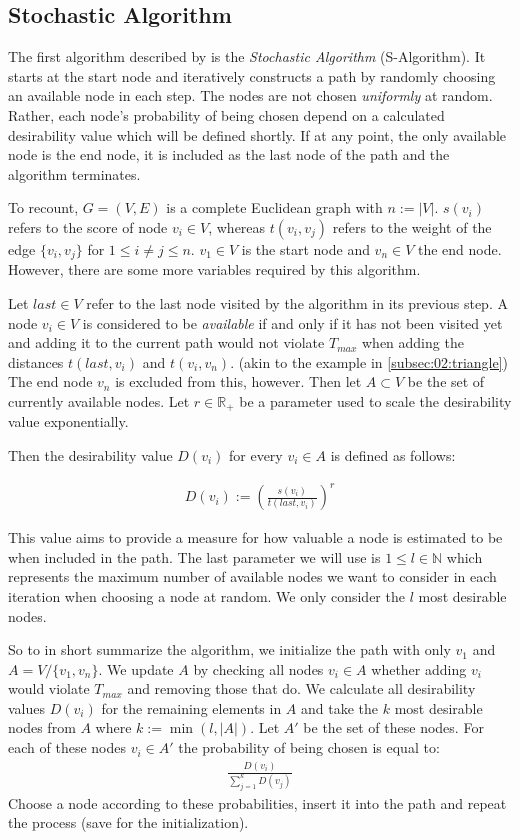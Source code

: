 \subsection{Stochastic Algorithm}
\label{subsec:03:salgo}

The first algorithm described by \citeauthor{tsiligiridis_heuristic_1984} is the \emph{Stochastic Algorithm} (S-Algorithm).
It starts at the start node and iteratively constructs a path by randomly choosing an available node in each step.
The nodes are not chosen \emph{uniformly} at random. Rather, each node's probability of being chosen depend on a calculated desirability value which will be defined shortly.
If at any point, the only available node is the end node, it is included as the last node of the path and the algorithm terminates.

To recount, $G = (V, E)$ is a complete Euclidean graph with $n := |V|$.
$s(v_i)$ refers to the score of node $v_i \in V$, whereas $t(v_i,v_j)$ refers to the weight of the edge $\{v_i, v_j\}$ for $1 \leq i \neq j \leq n$.
$v_1 \in V$ is the start node and $v_n \in V$ the end node.
However, there are some more variables required by this algorithm.

Let $last \in V$ refer to the last node visited by the algorithm in its previous step.
A node $v_i \in V$ is considered to be \emph{available} if and only if it has not been visited yet and adding it to the current path would not violate $T_{max}$ when adding the distances $t(last, v_i)$ and $t(v_i, v_n)$. (akin to the example in \cref{subsec:02:triangle}) 
The end node $v_n$ is excluded from this, however.
Then let $A \subset V$ be the set of currently available nodes. 
Let $r \in \mathbb{R}_+$ be a parameter used to scale the desirability value exponentially.

Then the desirability value $D(v_i)$ for every $v_i \in A$ is defined as follows:

\begin{align*}
    D(v_i) := \left( \frac{s(v_i)}{t(last, v_i)} \right)^r
\end{align*}

This value aims to provide a measure for how valuable a node is estimated to be when included in the path.
The last parameter we will use is $1 \leq l \in \mathbb{N}$ which represents the maximum number of available nodes we want to consider in each iteration when choosing a node at random.
We only consider the $l$ most desirable nodes.

So to in short summarize the algorithm, we initialize the path with only $v_1$ and $A = V / \{v_1, v_n\}$.
We update $A$ by checking all nodes $v_i \in A$ whether adding $v_i$ would violate $T_{max}$ and removing those that do. 
We calculate all desirability values $D(v_i)$ for the remaining elements in $A$ and take the $k$ most desirable nodes from $A$ where $k := \min(l, |A|)$. Let $A'$ be the set of these nodes.
For each of these nodes $v_i \in A'$ the probability of being chosen is equal to:
\begin{align*}
    \frac{D(v_i)}{\sum_{j=1}^k D(v_j)}
\end{align*}
Choose a node according to these probabilities, insert it into the path and repeat the process (save for the initialization).

